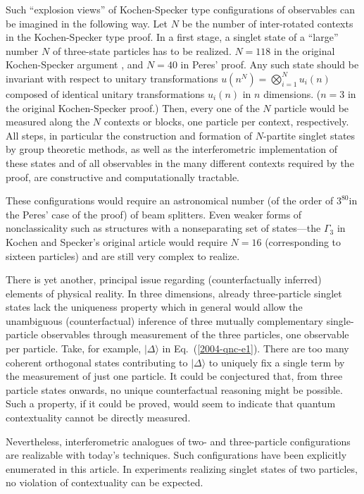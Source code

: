 \documentclass[pra,preprint,showpacs,showkeys,amsfonts]{revtex4}
\begin{document}
Such
``explosion views'' of  Kochen-Specker
type configurations of observables can be imagined in the following way.
Let $N$ be the number of inter-rotated contexts in the Kochen-Specker type proof.
In a first stage, a singlet state of a ``large'' number $N$
of three-state particles has to be realized.
$N=118$ in the original
Kochen-Specker argument \cite{kochen1},
and $N=40$ in Peres'  \cite{peres,svozil-tkadlec} proof.
Any such state should be invariant with respect to unitary transformations
$u(n^N)=\bigotimes_{i=1}^N u_i(n)$ composed of identical unitary
transformations $u_i(n)$ in $n$ dimensions.
($n=3$ in the original Kochen-Specker proof.)
Then, every one of the $N$ particle would be measured along
the $N$ contexts or blocks,  one particle per context, respectively.
All steps, in particular the construction and formation of $N$-partite singlet states
by group theoretic methods,
as well as the interferometric implementation of these states
and of all observables in the many different contexts required by the
proof, are constructive and computationally tractable.

These  configurations
would require an astronomical number (of the order of $3^{80}$in the Peres' case of the proof)
of beam splitters.
Even weaker forms of nonclassicality such as structures with
a nonseparating set of states---the $\Gamma_3$ in Kochen and Specker's original article
\cite{kochen1} would require $N=16$ (corresponding to sixteen particles)
and are still very complex to realize.

There is yet another, principal issue regarding (counterfactually inferred) elements of physical reality.
In three dimensions, already three-particle singlet states lack the uniqueness property  \cite{svozil-2004-qnc}
which in general would allow the
unambiguous (counterfactual) inference of three mutually complementary single-particle observables through
measurement of the three particles, one observable per particle.
Take, for example,  $\vert \Delta \rangle$ in Eq.~(\ref{2004-qnc-e1}).
There are too many coherent
orthogonal states contributing to  $\vert \Delta \rangle$ to uniquely fix a single term by the measurement of just
one particle.
It could be conjectured that, from three particle states onwards,
no unique counterfactual reasoning might be possible.
Such a property, if it could be proved, would seem to indicate that quantum
contextuality cannot be directly measured.

Nevertheless, interferometric analogues of two- and three-particle
configurations are realizable with today's techniques.
Such configurations have been explicitly enumerated in this article.
In experiments realizing singlet states of two particles,
no violation of contextuality can be expected.
\end{document}
